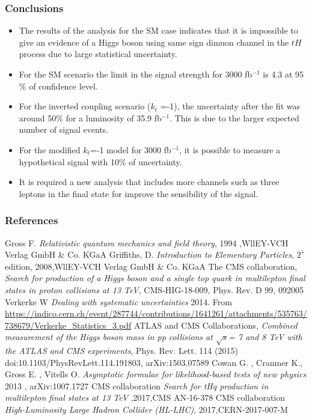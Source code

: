 \documentclass[11pt]{beamer}
\begin{document}
\begin{frame}
\frametitle{Conclusions}
\begin{itemize}
\item The results of the analysis for the SM case indicates that it is impossible to give an evidence of a Higgs boson using same sign dimuon channel in the $tH$ process due to large statistical uncertainty.
\item For the SM scenario the limit in the signal strength for 3000 fb$^{-1}$ is 4.3 at 95$\%$ of confidence level.
\item For the inverted coupling scenario ($k_t$ =-1), the uncertainty after the fit was around 50$\%$ for a luminosity of 35.9 fb$^{-1}$. This is due to the larger expected number of signal events.
\item For the modified $k_t$=-1 model for 3000 fb$^{-1}$, it is possible to measure a hypothetical signal with 10$\%$ of uncertainty.
\item It is required a new analysis that includes more channels such as three leptons in the final state for improve the sensibility of the signal.
\end{itemize}
\end{frame}


	\begin{thebibliography}{99}
		
	\begin{frame}
	\tiny
	\frametitle{References}
	
	Gross F. \textit{Relativistic quantum mechanics and field theory}, 1994 ,WllEY-VCH Verlag GmbH \& Co. KGaA
	 Griffiths, D. \textit{Introduction to Elementary Particles}, $2^\frac{\circ}{}$ edition, 2008,WllEY-VCH Verlag GmbH \& Co. KGaA
		The CMS collaboration, \textit{Search for production of a Higgs boson and a single top
	quark in multilepton final states in proton collisions at 13 TeV}, CMS-HIG-18-009, Phys. Rev. D 99, 092005
	Verkerke W \textit{Dealing with systematic uncertainties} 2014. From
\url{https://indico.cern.ch/event/287744/contributions/1641261/attachments/535763/738679/Verkerke_Statistics_3.pdf}
 ATLAS and CMS
Collaborations, \textit{Combined measurement of the Higgs boson mass in
	pp collisions at $\sqrt{s}$= 7 and 8 TeV with the ATLAS and CMS experiments}, Phys. Rev. Lett.
114 (2015) doi:10.1103/PhysRevLett.114.191803, arXiv:1503.07589
 Cowan G. , Cranmer K., Gross E. , Vitells O.\textit{ Asymptotic formulae for
	likelihood-based tests of new physics} 2013 , arXiv:1007.1727
CMS collaboration \textit{Search for tHq production in multilepton final states at 13 TeV} ,2017,CMS AN-16-378
CMS collaboration \textit{High-Luminosity Large Hadron Collider (HL-LHC)}, 2017,CERN-2017-007-M
\end{frame}
\end{thebibliography}
\end{document}
